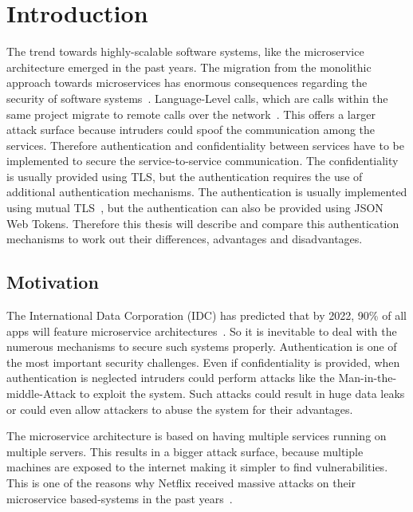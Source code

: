 \chapter{Introduction}
\label{cha:Introduction}
The trend towards highly-scalable software systems, like the microservice architecture emerged in the past years.
The migration from the monolithic approach towards microservices has enormous consequences regarding the security of software systems~\cite{shmeleva2020microservices}. 
Language-Level calls, which are calls within the same project migrate to remote calls over the network~\cite{chandramouli2019microservices}. 
This offers a larger attack surface because intruders could spoof the communication among the services.
Therefore authentication and confidentiality between services have to be implemented to secure the service-to-service communication.
The confidentiality is usually provided using TLS, but the authentication requires the use of additional authentication mechanisms.
The authentication is usually implemented using mutual TLS~\cite{dias2020microservices}, but the authentication can also be provided using JSON Web Tokens.
Therefore this thesis will describe and compare this authentication mechanisms to work out their differences, advantages and disadvantages.

\section{Motivation}
The International Data Corporation (IDC) has predicted that by 2022, 90\% of all apps will feature microservice architectures~\cite{idcprediction2019}. 
So it is inevitable to deal with the numerous mechanisms to secure such systems properly. 
Authentication is one of the most important security challenges.
Even if confidentiality is provided, when authentication is neglected intruders could perform attacks like the Man-in-the-middle-Attack to exploit the system.
Such attacks could result in huge data leaks or could even allow attackers to abuse the system for their advantages.

The microservice architecture is based on having multiple services running on multiple servers.
This results in a bigger attack surface, because multiple machines are exposed to the internet making it simpler to find vulnerabilities.
This is one of the reasons why Netflix received massive attacks on their microservice based-systems in the past years~\cite{pereira2019security}.

